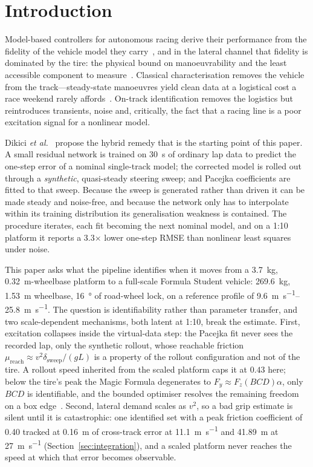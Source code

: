 \section{Introduction}

Model-based controllers for autonomous racing derive their performance from the
fidelity of the vehicle model they carry~\cite{kabzan2019lbmpc}, and in the
lateral channel that fidelity is dominated by the tire: the physical bound on
manoeuvrability and the least accessible component to
measure~\cite{pacejka2012book}. Classical characterisation removes the vehicle
from the track---steady-state manoeuvres yield clean data at a logistical cost
a race weekend rarely affords~\cite{ontrack2025}. On-track identification
removes the logistics but reintroduces transients, noise and, critically, the
fact that a racing line is a poor excitation signal for a nonlinear model.

Dikici \emph{et al.}~\cite{ontrack2025} propose the hybrid remedy that is the
starting point of this paper. A small residual network is trained on
\SI{30}{\second} of ordinary lap data to predict the one-step error of a
nominal single-track model; the corrected model is rolled out through a
\emph{synthetic}, quasi-steady steering sweep; and Pacejka coefficients are
fitted to that sweep. Because the sweep is generated rather than driven it can
be made steady and noise-free, and because the network only has to interpolate
within its training distribution its generalisation weakness is contained. The
procedure iterates, each fit becoming the next nominal model, and on a 1:10
platform it reports a \num{3.3}$\times$ lower one-step RMSE than nonlinear
least squares under noise.

This paper asks what the pipeline identifies when it moves from a
\SI{3.7}{\kilo\gram}, \SI{0.32}{\meter}-wheelbase platform to a full-scale
Formula Student vehicle: \SI{269.6}{\kilo\gram}, \SI{1.53}{\meter} wheelbase,
\SI{16}{\degree} of road-wheel lock, on a reference profile of
\SIrange{9.6}{25.8}{\meter\per\second}. The question is identifiability rather
than parameter transfer, and two scale-dependent mechanisms, both latent at
1:10, break the estimate. First, excitation collapses inside the
virtual-data step: the Pacejka fit never sees the recorded lap, only the
synthetic rollout, whose reachable friction
$\mu_{\mathrm{reach}}\!\approx\!v^{2}\delta_{\mathrm{sweep}}/(gL)$ is a
property of the rollout configuration and not of the tire. A rollout speed inherited from the scaled platform caps it at $0.43$ here;
below the tire's peak the Magic Formula degenerates to $F_{y}\approx
F_{z}(BCD)\alpha$, only $BCD$ is identifiable, and the bounded optimiser
resolves the remaining freedom on a box edge~\cite{ljung1999sysid}. Second, lateral
demand scales as $v^{2}$, so a bad grip estimate is silent until it is
catastrophic: one identified set with a peak friction coefficient of \num{0.40}
tracked at \SI{0.16}{\meter} of cross-track error at
\SI{11.1}{\meter\per\second} and \SI{41.89}{\meter} at
\SI{27}{\meter\per\second} (Section~\ref{sec:integration}), and a scaled
platform never reaches the speed at which that error becomes observable.

